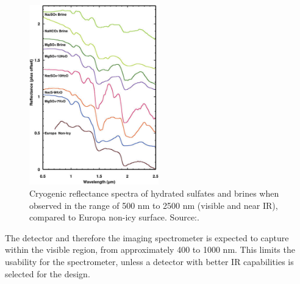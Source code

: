 \begin{figure}[h!]
\centering
\includegraphics[width=0.5\textwidth]{figures/Orbiter/surface_assessment_sulfate_brine}
\caption{Cryogenic reflectance spectra of hydrated sulfates and brines when observed in the range of 500 nm to 2500 nm (visible and near IR), compared to Europa non-icy surface. Source:\cite{pappalardo2013a}.}
\label{fig:material_assessment_spectra}
\end{figure}
The detector and therefore the imaging spectrometer is expected to capture within the visible region, from approximately 400 to 1000 nm. This limits the usability for the spectrometer, unless a detector with better IR capabilities is selected for the design.

